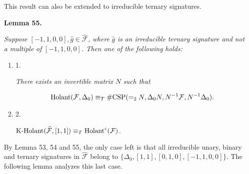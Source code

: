 \documentclass[10pt,a4paper]{article}
\begin{document}



This result can also be extended to irreducible ternary signatures.\par





\par\medskip\noindent\textbf{
\textbf{Lemma 55}\textbf{.}
}\par



\emph{Suppose $[-1,1,0,0],\widehat{g}\in\widehat{\mathcal{F}}$, where $\widehat{g}$ is an irreducible ternary signature and not a multiple of $[-1,1,0,0]$. Then one of the following holds:}\par


\begin{enumerate}


\item[] 
1. 


\emph{There exists an invertible matrix }$N$\emph{ such that}\par


\[\begin{gathered}
\textup{{Holant}}(\mathcal{F},\Delta_{0})\equiv_{T}\textup{{\#CSP}}(=_{2}N,\Delta_{0}N,N^{-1}\mathcal{F},N^{-1}\Delta_{0}).
\end{gathered}\]





\item[] 
2. 


$\textup{{K-Holant}}(\widehat{\mathcal{F}},[1,1])\equiv_{T}\textup{{Holant}}^{c}(\mathcal{F})$\emph{.}\par





\end{enumerate}






By Lemma 53, 54 and 55, the only case left is that all irreducible unary, binary and ternary signatures in $\widehat{\mathcal{F}}$ belong to $\{\Delta_{0},[1,1],[0,1,0],[-1,1,0,0]\}$. The following lemma analyzes this last case.\par



\end{document}

